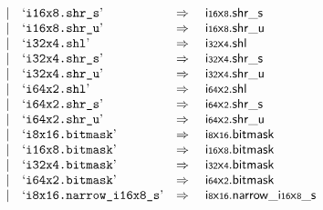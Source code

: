 $$\begin{array}[t]{@{}lrrl@{}l@{}l@{}l@{}}
& & | & \mbox{‘\texttt{i16x8.shr\_s}’} & \quad\Rightarrow\quad{} & {\mathsf{i{\scriptstyle 16}}}{\mathsf{x}}{\mathsf{{\scriptstyle 8}}} {.} {\mathsf{shr}}{\mathsf{\_}}{\mathsf{s}} \\
& & | & \mbox{‘\texttt{i16x8.shr\_u}’} & \quad\Rightarrow\quad{} & {\mathsf{i{\scriptstyle 16}}}{\mathsf{x}}{\mathsf{{\scriptstyle 8}}} {.} {\mathsf{shr}}{\mathsf{\_}}{\mathsf{u}} \\
& & | & \mbox{‘\texttt{i32x4.shl}’} & \quad\Rightarrow\quad{} & {\mathsf{i{\scriptstyle 32}}}{\mathsf{x}}{\mathsf{{\scriptstyle 4}}} {.} \mathsf{shl} \\
& & | & \mbox{‘\texttt{i32x4.shr\_s}’} & \quad\Rightarrow\quad{} & {\mathsf{i{\scriptstyle 32}}}{\mathsf{x}}{\mathsf{{\scriptstyle 4}}} {.} {\mathsf{shr}}{\mathsf{\_}}{\mathsf{s}} \\
& & | & \mbox{‘\texttt{i32x4.shr\_u}’} & \quad\Rightarrow\quad{} & {\mathsf{i{\scriptstyle 32}}}{\mathsf{x}}{\mathsf{{\scriptstyle 4}}} {.} {\mathsf{shr}}{\mathsf{\_}}{\mathsf{u}} \\
& & | & \mbox{‘\texttt{i64x2.shl}’} & \quad\Rightarrow\quad{} & {\mathsf{i{\scriptstyle 64}}}{\mathsf{x}}{\mathsf{{\scriptstyle 2}}} {.} \mathsf{shl} \\
& & | & \mbox{‘\texttt{i64x2.shr\_s}’} & \quad\Rightarrow\quad{} & {\mathsf{i{\scriptstyle 64}}}{\mathsf{x}}{\mathsf{{\scriptstyle 2}}} {.} {\mathsf{shr}}{\mathsf{\_}}{\mathsf{s}} \\
& & | & \mbox{‘\texttt{i64x2.shr\_u}’} & \quad\Rightarrow\quad{} & {\mathsf{i{\scriptstyle 64}}}{\mathsf{x}}{\mathsf{{\scriptstyle 2}}} {.} {\mathsf{shr}}{\mathsf{\_}}{\mathsf{u}} \\
& & | & \mbox{‘\texttt{i8x16.bitmask}’} & \quad\Rightarrow\quad{} & {\mathsf{i{\scriptstyle 8}}}{\mathsf{x}}{\mathsf{{\scriptstyle 16}}}{.}\mathsf{bitmask} \\
& & | & \mbox{‘\texttt{i16x8.bitmask}’} & \quad\Rightarrow\quad{} & {\mathsf{i{\scriptstyle 16}}}{\mathsf{x}}{\mathsf{{\scriptstyle 8}}}{.}\mathsf{bitmask} \\
& & | & \mbox{‘\texttt{i32x4.bitmask}’} & \quad\Rightarrow\quad{} & {\mathsf{i{\scriptstyle 32}}}{\mathsf{x}}{\mathsf{{\scriptstyle 4}}}{.}\mathsf{bitmask} \\
& & | & \mbox{‘\texttt{i64x2.bitmask}’} & \quad\Rightarrow\quad{} & {\mathsf{i{\scriptstyle 64}}}{\mathsf{x}}{\mathsf{{\scriptstyle 2}}}{.}\mathsf{bitmask} \\
& & | & \mbox{‘\texttt{i8x16.narrow\_i16x8\_s}’} & \quad\Rightarrow\quad{} & {{\mathsf{i{\scriptstyle 8}}}{\mathsf{x}}{\mathsf{{\scriptstyle 16}}}{.}\mathsf{narrow}}{\mathsf{\_}}{{\mathsf{i{\scriptstyle 16}}}{\mathsf{x}}{\mathsf{{\scriptstyle 8}}}}{\mathsf{\_}}{\mathsf{s}} \\

\end{array}$$
